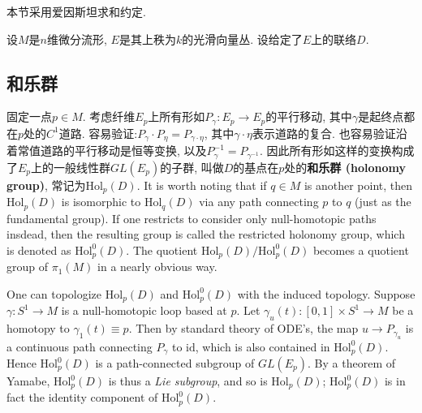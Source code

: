 
本节采用爱因斯坦求和约定.

设$M$是$n$维微分流形, $E$是其上秩为$k$的光滑向量丛. 设给定了$E$上的联络$D$.

\subsection{和乐群}
固定一点$p\in M$. 考虑纤维$E_p$上所有形如$P_\gamma:E_p\to E_p$的平行移动, 其中$\gamma$是起终点都在$p$处的$C^1$道路. 容易验证:$P_\gamma\cdot P_\eta=P_{\gamma\cdot\eta}$,
其中$\gamma\cdot\eta$表示道路的复合. 也容易验证沿着常值道路的平行移动是恒等变换, 以及$P_\gamma^{-1}=P_{\gamma^{-1}}$. 因此所有形如这样的变换构成了$E_p$上的一般线性群$GL(E_p)$的子群, 叫做$D$的基点在$p$处的\textbf{和乐群 (holonomy group)}, 常记为$\text{Hol}_p(D)$. It is worth noting that if $q\in M$ is another point, then $\text{Hol}_p(D)$ is isomorphic to $\text{Hol}_q(D)$ via any path connecting $p$ to $q$ (just as the fundamental group). If one restricts to consider only null-homotopic paths insdead, then the resulting group is called the restricted holonomy group, which is denoted as $\text{Hol}^0_p(D)$. The quotient $\text{Hol}_p(D)/\text{Hol}_p^0(D)$ becomes a quotient group of $\pi_1(M)$ in a nearly obvious way.

One can topologize $\text{Hol}_p(D)$ and $\text{Hol}_p^0(D)$ with the induced topology. Suppose $\gamma:S^1\to M$ is a null-homotopic loop based at $p$. Let $\gamma_u(t):[0,1]\times S^1\to M$ be a homotopy to $\gamma_1(t)\equiv p$. Then by standard theory of ODE's, the map $u\to P_{\gamma_u}$ is a continuous path connecting $P_\gamma$ to $\text{id}$, which is also contained in $\text{Hol}_p^0(D)$. Hence $\text{Hol}_p^0(D)$ is a path-connected subgroup of $GL(E_p)$. By a theorem of Yamabe, $\text{Hol}_p^0(D)$ is thus a \emph{Lie subgroup}, and so is $\text{Hol}_p(D)$; $\text{Hol}_p^0(D)$ is in fact the identity component of $\text{Hol}_p^0(D)$.

